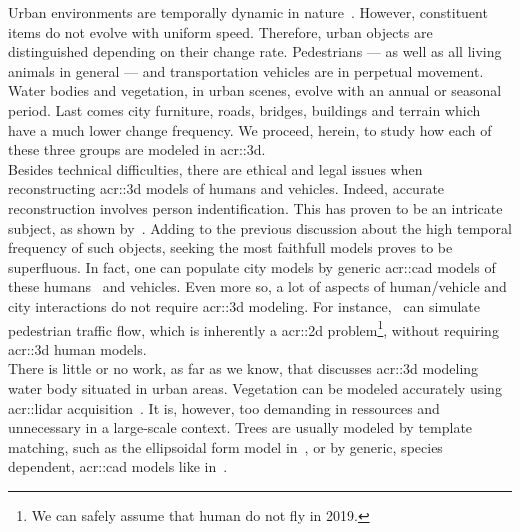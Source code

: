             Urban environments are temporally dynamic in nature~\parencite{vanhoey2017varcity}.
            However, constituent items do not evolve with uniform speed.
            Therefore, urban objects are distinguished depending on their change rate.
            Pedestrians --- as well as all living animals in general --- and transportation vehicles are in perpetual movement.
            Water bodies and vegetation, in urban scenes, evolve with an annual or seasonal period.
            Last comes city furniture, roads, bridges, buildings and terrain which have a much lower change frequency.
            We proceed, herein, to study how each of these three groups are modeled in \gls{acr::3d}.\\

            Besides technical difficulties, there are ethical and legal issues when reconstructing \gls{acr::3d} models of humans and vehicles.
            Indeed, accurate reconstruction involves person indentification.
            This has proven to be an intricate subject, as shown by~\textcite{thornton2010individual,tavani2011ethics}.
            Adding to the previous discussion about the high temporal frequency of such objects, seeking the most faithfull models proves to be superfluous.
            In fact, one can populate city models by generic \gls{acr::cad} models of these humans~\parencite{shao2007autonomous} and vehicles.
            Even more so, a lot of aspects of human/vehicle and city interactions do not require \gls{acr::3d} modeling.
            For instance,~\textcite{lovaas1994modeling} can simulate pedestrian traffic flow, which is inherently a \gls{acr::2d} problem\footnote{
                We can safely assume that human do not fly in 2019.
            }, without requiring \gls{acr::3d} human models.\\
            There is little or no work, as far as we know, that discusses \gls{acr::3d} modeling water body situated in urban areas.
            Vegetation can be modeled accurately using \gls{acr::lidar} acquisition~\parencite{omasa20063d}.
            It is, however, too demanding in ressources and unnecessary in a large-scale context.
            Trees are usually modeled by template matching, such as the ellipsoidal form model in~\textcite{lafarge2012creating}, or by generic, species dependent, \gls{acr::cad} models like in~\textcite{iovan2008detection}.\\
